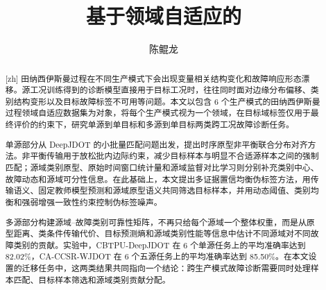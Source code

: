 \documentclass{seuthesis-2022}
\title{基于领域自适应的}{工业过程故障诊断方法研究}
\author{陈鲲龙}
\begin{document}




\frontmatter
\begin{abstract}[zh]
田纳西伊斯曼过程在不同生产模式下会出现变量相关结构变化和故障响应形态漂移。源工况训练得到的诊断模型直接用于目标工况时，往往同时面对边缘分布偏移、类别结构变形以及目标故障标签不可用等问题。本文以包含 6 个生产模式的田纳西伊斯曼过程领域自适应数据集为对象，将每个生产模式视为一个领域，在目标域标签仅用于最终评价的约束下，研究单源到单目标和多源到单目标两类跨工况故障诊断任务。

单源部分从 DeepJDOT 的小批量匹配问题出发，提出时序原型非平衡联合分布对齐方法。非平衡传输用于放松批内边际约束，减少目标样本与明显不合适源样本之间的强制匹配；源域类别原型、原始时间窗口统计量和源域监督对比学习则分别补充类别中心、故障动态和源域可分性信息。在此基础上，本文提出多证据置信均衡伪标签方法，用传输语义、固定教师模型预测和源域原型语义共同筛选目标样本，并用动态阈值、类别均衡和强弱增强一致性约束控制伪标签噪声。

多源部分构建源域--故障类别可靠性矩阵，不再只给每个源域一个整体权重，而是从原型距离、类条件传输代价、目标预测熵和源域类别性能等信息中估计不同源域对不同故障类别的贡献。实验中，CBTPU-DeepJDOT 在 6 个单源任务上的平均准确率达到 82.02\%，CA-CCSR-WJDOT 在 6 个五源任务上的平均准确率达到 85.50\%。在本文设置的迁移任务中，这两类结果共同指向一个结论：跨生产模式故障诊断需要同时处理样本匹配、目标样本筛选和源域类别贡献分配。
\end{abstract}
\end{document}
